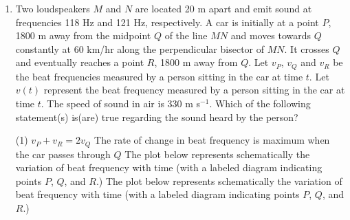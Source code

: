 
\begin{enumerate}
    \item Two loudspeakers \(M\) and \(N\) are located 20 m apart and emit sound at frequencies 118 Hz and 121 Hz, respectively. A car is initially at a point \(P\), 1800 m away from the midpoint \(Q\) of the line \(MN\) and moves towards \(Q\) constantly at 60 km/hr along the perpendicular bisector of \(MN\). It crosses \(Q\) and eventually reaches a point \(R\), 1800 m away from \(Q\). Let \(v_P\), \(v_Q\) and \(v_R\) be the beat frequencies measured by a person sitting in the car at time \(t\). Let \(v(t)\) represent the beat frequency measured by a person sitting in the car at time \(t\). The speed of sound in air is 330 m s\(^{-1}\). Which of the following statement(s) is(are) true regarding the sound heard by the person?
        \begin{tasks}(1)
            \task \(v_P + v_R = 2 v_Q\)
            \task The rate of change in beat frequency is maximum when the car passes through \(Q\)
            \task The plot below represents schematically the variation of beat frequency with time (with a labeled diagram indicating points \(P\), \(Q\), and \(R\).)
            \task The plot below represents schematically the variation of beat frequency with time (with a labeled diagram indicating points \(P\), \(Q\), and \(R\).)
        \end{tasks}
\end{enumerate}
\begin{center}
\end{center}
